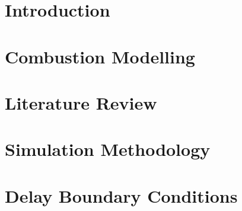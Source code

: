 \documentclass[lmr,second,hyperref,rgb,hyperref,dvipsnames]{uom_thesis_casson}
\title{\xmp@Title}
\author{\xmp@Author}
\begin{document}
\maketitle
\cleardoublepage

% 

\setcounter{page}{5}

\cleardoublepage

\uomtoc
\cleardoublepage

\uomstartmainbody %

\chapter{Introduction} \label{ch:intro}

\cleardoublepage

\chapter{Combustion Modelling} \label{ch:combust-model}

\cleardoublepage

\chapter{Literature Review} \label{ch:lit-review}

\cleardoublepage

\chapter{Simulation Methodology} \label{ch:dns-methods}

\cleardoublepage

% 

\chapter{Delay Boundary Conditions} \label{ch:delay-bcs}

\cleardoublepage
\end{document}
